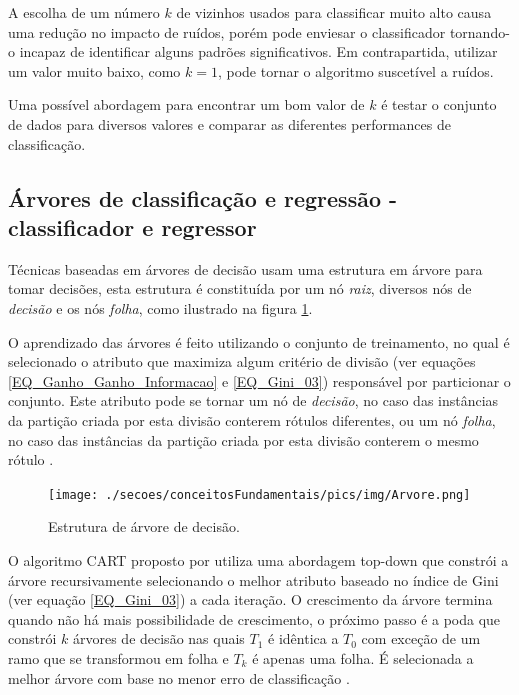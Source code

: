 A escolha de um número \(k\) de vizinhos usados para classificar muito alto causa uma redução no impacto de ruídos, porém pode enviesar o classificador tornando-o incapaz de identificar alguns padrões significativos. Em contrapartida, utilizar um valor muito baixo, como \(k = 1\), pode tornar o algoritmo suscetível a ruídos.

Uma possível abordagem para encontrar um bom valor de \(k\) é testar o conjunto de dados para diversos valores e comparar as diferentes performances de classificação.

\subsection{Árvores de classificação e regressão - classificador e regressor}
Técnicas baseadas em árvores de decisão usam uma estrutura em árvore para tomar decisões, esta estrutura é constituída por um nó \emph{raiz}, diversos nós de \emph{decisão} e os nós \emph{folha}, como ilustrado na figura \ref{FIGURA_ARVORE_DECISAO}. 

O aprendizado das árvores é feito utilizando o conjunto de treinamento, no qual é selecionado o atributo que maximiza algum critério de divisão (ver equações \eqref{EQ_Ganho_Ganho_Informacao} e \eqref{EQ_Gini_03}) responsável por particionar o conjunto. Este atributo pode se tornar um nó de \emph{decisão}, no caso das instâncias da partição criada por esta divisão conterem rótulos diferentes, ou um nó \emph{folha}, no caso das instâncias da partição criada por esta divisão conterem o mesmo rótulo \cite{HanKamber2011}.
\begin{figure}[hbt]
	\centering
 	  \caption{Estrutura de árvore de decisão.}
		\texttt{[image: ./secoes/conceitosFundamentais/pics/img/Arvore.png]}
	\label{FIGURA_ARVORE_DECISAO}
\end{figure}

O algoritmo CART proposto por  utiliza uma abordagem top-down que constrói a árvore recursivamente selecionando o melhor atributo baseado no índice de Gini (ver equação \eqref{EQ_Gini_03}) a cada iteração. O crescimento da árvore termina quando não há mais possibilidade de crescimento, o próximo passo é a poda que constrói \(k\) árvores de decisão nas quais \(T_{1}\) é idêntica a \(T_{0}\) com exceção de um ramo que se transformou em folha e \(T_{k}\) é apenas uma folha. É selecionada a melhor árvore com base no menor erro de classificação \cite{Breiman1984}. 

